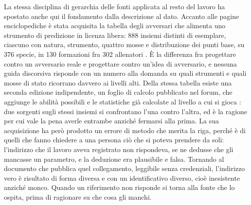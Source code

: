 La stessa disciplina di gerarchia delle fonti applicata al resto del lavoro ha spostato anche qui il fondamento dalla descrizione al dato. Accanto alle pagine enciclopediche è stata acquisita la tabella degli avversari che alimenta uno strumento di predizione in licenza libera: 888 insiemi distinti di esemplare, ciascuno con natura, strumento, quattro mosse e distribuzione dei punti base, su 376 specie, in 130 formazioni fra 302 allenatori \cite{domeassistant}. È la differenza fra progettare contro un avversario reale e progettare contro un'idea di avversario, e nessuna guida discorsiva risponde con un numero alla domanda su quali strumenti e quali mosse di stato ricorrano davvero ai livelli alti. Della stessa tabella esiste una seconda edizione indipendente, un foglio di calcolo pubblicato nel forum, che aggiunge le abilità possibili e le statistiche già calcolate al livello a cui si gioca \cite{smogon-maxstats-frontiera}: due sorgenti sugli stessi insiemi si confrontano l'una contro l'altra, ed è la ragione per cui vale la pena averle entrambe anziché fermarsi alla prima. La sua acquisizione ha però prodotto un errore di metodo che merita la riga, perché è di quelli che fanno chiedere a una persona ciò che si poteva prendere da soli: l'indirizzo che il lavoro aveva registrato non rispondeva, se ne dedusse che gli mancasse un parametro, e la deduzione era plausibile e falsa. Tornando al documento che pubblica quel collegamento, leggibile senza credenziali, l'indirizzo vero è risultato di forma diversa e con un identificativo diverso, cioè inesistente anziché monco. Quando un riferimento non risponde si torna alla fonte che lo ospita, prima di ragionare su che cosa gli manchi.

